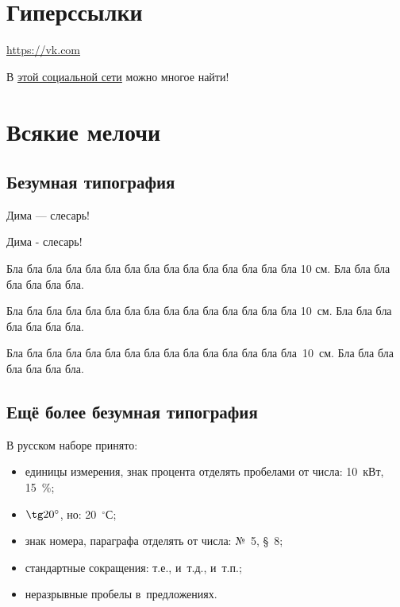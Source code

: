 \documentclass[12pt, a4paper]{article}
\begin{document}
\section{Гиперссылки}

\url{https://vk.com}

В \href{https://vk.com}{этой социальной сети} можно многое найти!

\section{Всякие мелочи}

\subsection{Безумная типография}

Дима --- слесарь!

Дима - слесарь!


Бла бла бла бла бла бла бла бла бла бла бла бла бла бла бла 10 см. Бла бла бла бла бла бла бла.

\vspace{2mm}

Бла бла бла бла бла бла бла бла бла бла бла бла бла бла бла 10~см. Бла бла бла бла бла бла бла.

\vspace{2mm}

Бла бла бла бла бла бла бла бла бла бла бла бла бла бла бла~10~см. Бла бла бла бла бла бла бла.


\subsection{Ещё более безумная типография}



В русском наборе принято:
\begin{itemize}
   \item единицы измерения, знак процента отделять пробелами от числа: 10~кВт, 15~\%;
   \item $\tg 20^\circ$, но: 20~${}^\circ$С;
   \item знак номера, параграфа отделять от числа: №~5, \S~8;
   \item стандартные сокращения: т.\:е., и~т.\:д., и~т.\:п.;
   \item неразрывные пробелы в~предложениях.
\end{itemize}
\end{document}
